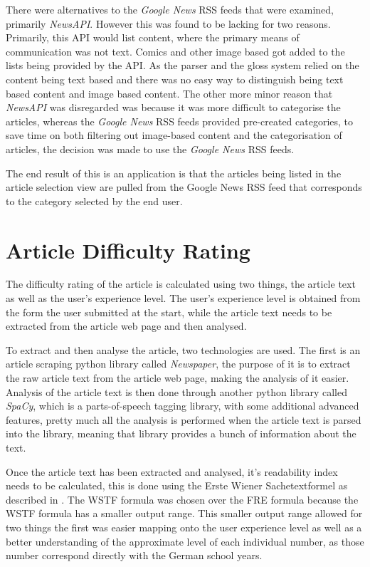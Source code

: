 There were alternatives to the \textit{Google News} RSS feeds that were examined, primarily \textit{NewsAPI}. However this was found to be lacking for two reasons. Primarily, this API would list content, where the primary means of communication was not text. Comics and other image based got added to the lists being provided by the API. As the parser and the gloss system relied on the content being text based and there was no easy way to distinguish being text based content and image based content. The other more minor reason that \textit{NewsAPI} was disregarded was because it was more difficult to categorise the articles, whereas the \textit{Google News} RSS feeds provided pre-created categories, to save time on both filtering out image-based content and the categorisation of articles, the decision was made to use the \textit{Google News} RSS feeds. 

The end result of this is an application is that the articles being listed in the article selection view are pulled from the Google News RSS feed that corresponds to the category selected by the end user.

\section{Article Difficulty Rating}

The difficulty rating of the article is calculated using two things, the article text as well as the user's experience level. The user's experience level is obtained from the form the user submitted at the start, while the article text needs to be extracted from the article web page and then analysed.

To extract and then analyse the article, two technologies are used. The first is an article scraping python library called \textit{Newspaper}, the purpose of it is to extract the raw article text from the article web page, making the analysis of it easier. Analysis of the article text is then done through another python library called \textit{SpaCy}, which is a parts-of-speech tagging library, with some additional advanced features, pretty much all the analysis is performed when the article text is parsed into the library, meaning that library provides a bunch of information about the text.

Once the article text has been extracted and analysed, it's readability index needs to be calculated, this is done using the Erste Wiener Sachetextformel as described in \textcite{bamberger1984}. The WSTF formula was chosen over the FRE formula because the WSTF formula has a smaller output range. This smaller output range allowed for two things the first was easier mapping onto the user experience level as well as a better understanding of the approximate level of each individual number, as those number correspond directly with the German school years. 

